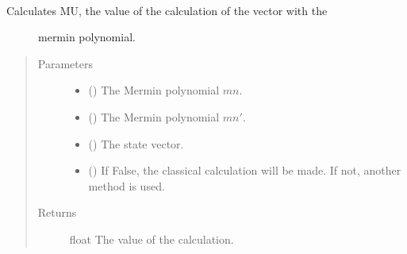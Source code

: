 \documentclass[letterpaper,10pt,english]{sphinxmanual}
\begin{document}
\begin{fulllineitems}
\label{\detokenize{mermin_polynomials-opti:mermin_on_qiskit.hypergraphstates_optimization.mermin_polynomials.mu_calculation}}~\begin{description}
\item[{Calculates MU, the value of the calculation of the vector with the }] \leavevmode
mermin polynomial.

\end{description}
\begin{quote}\begin{description}
\item[{Parameters}] \leavevmode\begin{itemize}
\item {} 
 (\sphinxstyleliteralemphasis{\sphinxupquote{(}}\sphinxstyleliteralemphasis{\sphinxupquote{)}}) \textendash{} The Mermin polynomial \(mn\).

\item {} 
 (\sphinxstyleliteralemphasis{\sphinxupquote{(}}\sphinxstyleliteralemphasis{\sphinxupquote{)}}) \textendash{} The Mermin polynomial \(mn'\).

\item {} 
 (\sphinxstyleliteralemphasis{\sphinxupquote{(}}\sphinxstyleliteralemphasis{\sphinxupquote{)}}) \textendash{} The state vector.

\item {} 
 () \textendash{} If False, the classical calculation will be made. 
If not, another method is used.

\end{itemize}

\item[{Returns}] \leavevmode
float \textendash{} The value of the calculation.

\end{description}\end{quote}

\end{fulllineitems}
\end{document}
